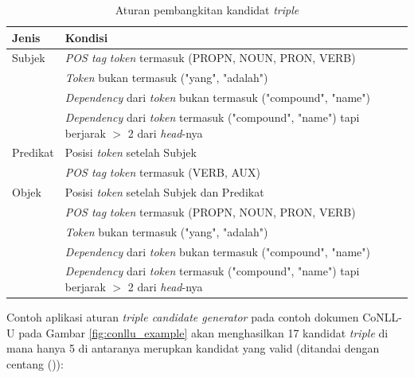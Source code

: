 \begin{table}
\renewcommand{\arraystretch}{1.5}
\caption{Aturan pembangkitan kandidat \textit{triple}}
\label{tab:triple_candidate_generation_rules}
\centering
\begin{tabular}{l p{12cm}}
\hline
\textbf{Jenis} & \textbf{Kondisi} \\
\hline
Subjek & \textit{POS tag} \textit{token} termasuk (PROPN, NOUN, PRON, VERB) \\
\space & \textit{Token} bukan termasuk ("yang", "adalah") \\
\space & \textit{Dependency} dari \textit{token} bukan termasuk ("compound", "name") \\
\space & \textit{Dependency} dari \textit{token} termasuk ("compound", "name") tapi berjarak $>$ 2 dari \textit{head}-nya \\
\hline
Predikat & Posisi \textit{token} setelah Subjek \\
\space & \textit{POS tag} \textit{token} termasuk (VERB, AUX) \\
\hline
Objek & Posisi \textit{token} setelah Subjek dan Predikat \\
\space & \textit{POS tag} \textit{token} termasuk (PROPN, NOUN, PRON, VERB) \\
\space & \textit{Token} bukan termasuk ("yang", "adalah") \\
\space & \textit{Dependency} dari \textit{token} bukan termasuk ("compound", "name") \\
\space & \textit{Dependency} dari \textit{token} termasuk ("compound", "name") tapi berjarak $>$ 2 dari \textit{head}-nya \\

\end{tabular}
\end{table}

Contoh aplikasi aturan \textit{triple candidate generator} pada contoh dokumen CoNLL-U pada Gambar \ref{fig:conllu_example} akan menghasilkan 17 kandidat \textit{triple} di mana hanya 5 di antaranya merupkan kandidat yang valid (ditandai dengan centang ()):

